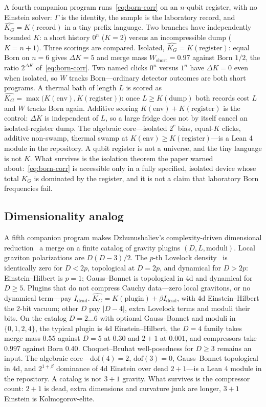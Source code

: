 \documentclass[11pt,a4paper]{article}
\theoremstyle{plain}
\theoremstyle{definition}
\theoremstyle{remark}
\newcommand{\KG}{K_{G}}
\newcommand{\abs}[1]{\lvert#1\rvert}
\begin{document}
A fourth companion program runs~\eqref{eq:born-corr} on an $n$-qubit register, with no Einstein solver: $\Gamma$ is the identity, the sample is the laboratory record, and $\widehat{\KG}=K(\mathrm{record})$ in a tiny prefix language.
Two branches have independently bounded $K$: a short history $0^{n}$ ($K=2$) versus an incompressible dump ($K=n+1$).
Three scorings are compared.
Isolated, $\widehat{\KG}=K(\mathrm{register})$: equal Born on $n=6$ gives $\Delta K=5$ and merge mass $W_{\mathrm{short}}=0.97$ against Born $1/2$, the ratio $2^{\Delta K}$ of~\eqref{eq:born-corr}.
Two named clicks $0^{n}$ versus $1^{n}$ have $\Delta K=0$ even when isolated, so $W$ tracks Born---ordinary detector outcomes are both short programs.
A thermal bath of length $L$ is scored as $\widehat{\KG}=\max\bigl(K(\mathrm{env}),K(\mathrm{register})\bigr)$: once $L\ge K(\mathrm{dump})$ both records cost $L$ and $W$ tracks Born again.
Additive scoring $K(\mathrm{env})+K(\mathrm{register})$ is the control: $\Delta K$ is independent of $L$, so a large fridge does not by itself cancel an isolated-register dump.
The algebraic core---isolated $2^{c}$ bias, equal-$K$ clicks, additive non-swamp, thermal swamp at $K(\mathrm{env})\ge K(\mathrm{register})$---is a Lean 4 module in the repository.
A qubit register is not a universe, and the tiny language is not $K$.
What survives is the isolation theorem the paper warned about:~\eqref{eq:born-corr} is accessible only in a fully specified, isolated device whose total $\KG$ is dominated by the register, and it is not a claim that laboratory Born frequencies fail.

\subsection{Dimensionality analog}

A fifth companion program makes Dzhunushaliev's complexity-driven dimensional reduction~\cite{dzhunushaliev1998,dzhunushaliev2002} a merge on a finite catalog of gravity plugins $(D,L,\text{moduli})$.
Local graviton polarizations are $D(D-3)/2$.
The $p$-th Lovelock density~\cite{lovelock1971} is identically zero for $D<2p$, topological at $D=2p$, and dynamical for $D>2p$: Einstein--Hilbert is $p=1$; Gauss--Bonnet is topological in $4$d and dynamical for $D\ge 5$.
Plugins that do not compress Cauchy data---zero local gravitons, or no dynamical term---pay $I_{\mathrm{dead}}$.
$\widehat{\KG}=K(\mathrm{plugin})+\beta I_{\mathrm{dead}}$, with $4$d Einstein--Hilbert the $2$-bit vacuum; other $D$ pay $\abs{D-4}$, extra Lovelock terms and moduli their bits.
On the catalog $D=2{\ldots}6$ with optional Gauss--Bonnet and moduli in $\{0,1,2,4\}$, the typical plugin is $4$d Einstein--Hilbert, the $D=4$ family takes merge mass $0.55$ against $D=5$ at $0.30$ and $2{+}1$ at $0.001$, and compressors take $0.997$ against Born $0.40$.
Choquet--Bruhat well-posedness for $D\ge 3$ remains an input.
The algebraic core---$\mathrm{dof}(4)=2$, $\mathrm{dof}(3)=0$, Gauss--Bonnet topological in $4$d, and $2^{1+\beta}$ dominance of $4$d Einstein over dead $2{+}1$---is a Lean 4 module in the repository.
A catalog is not $3{+}1$ gravity.
What survives is the compressor count: $2{+}1$ is dead, extra dimensions and curvature junk are longer, $3{+}1$ Einstein is Kolmogorov-elite.
\end{document}

